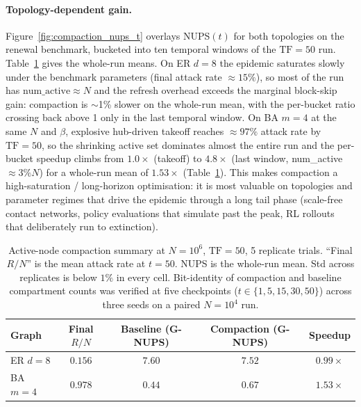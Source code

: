 \paragraph{Topology-dependent gain.}
Figure~\ref{fig:compaction_nups_t} overlays NUPS$(t)$ for both topologies on the renewal benchmark, bucketed into ten temporal windows of the $\mathrm{TF}=50$ run. Table~\ref{tab:compaction_summary} gives the whole-run means. On ER $d{=}8$ the epidemic saturates slowly under the benchmark parameters (final attack rate $\approx 15\%$), so most of the run has $\mathrm{num\_active} \approx N$ and the refresh overhead exceeds the marginal block-skip gain: compaction is $\sim$1\% slower on the whole-run mean, with the per-bucket ratio crossing back above 1 only in the last temporal window. On BA $m{=}4$ at the same $N$ and $\beta$, explosive hub-driven takeoff reaches $\approx 97\%$ attack rate by $\mathrm{TF}=50$, so the shrinking active set dominates almost the entire run and the per-bucket speedup climbs from $1.0\times$ (takeoff) to $4.8\times$ (last window, num\_active $\approx 3\% N$) for a whole-run mean of $\mathbf{1.53\times}$ (Table~\ref{tab:compaction_summary}). This makes compaction a high-saturation / long-horizon optimisation: it is most valuable on topologies and parameter regimes that drive the epidemic through a long tail phase (scale-free contact networks, policy evaluations that simulate past the peak, RL rollouts that deliberately run to extinction).

\begin{table}[H]
\caption{Active-node compaction summary at $N{=}10^6$, $\mathrm{TF}{=}50$, 5 replicate trials. ``Final $R/N$'' is the mean attack rate at $t{=}50$. NUPS is the whole-run mean. Std across replicates is below $1\%$ in every cell. Bit-identity of compaction and baseline compartment counts was verified at five checkpoints ($t \in \{1, 5, 15, 30, 50\}$) across three seeds on a paired $N{=}10^4$ run.}
\label{tab:compaction_summary}
\centering
\begin{tabular*}{\linewidth}{@{\extracolsep{\fill}}lcccc@{}}
\toprule
\textbf{Graph} & \textbf{Final $R/N$} & \textbf{Baseline (G-NUPS)} & \textbf{Compaction (G-NUPS)} & \textbf{Speedup} \\
\midrule
ER $d{=}8$  & $0.156$ & $7.60$ & $7.52$ & $0.99\times$ \\
BA $m{=}4$  & $0.978$ & $0.44$ & $0.67$ & $\mathbf{1.53\times}$ \\
\bottomrule
\end{tabular*}
\end{table}

